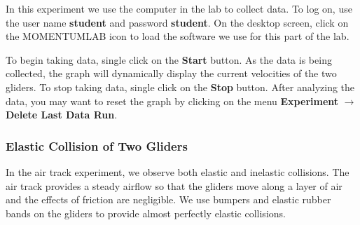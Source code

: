 In this experiment we use the computer in the lab to collect data. To log on, use the user name \textbf{student} and password \textbf{student}. On the desktop screen, click on the MOMENTUMLAB icon to load the software we use for this part of the lab.
\myskip

To begin taking data, single click on the \textbf{Start} button. As the data is being collected, the graph will dynamically display the current velocities of the two gliders. To stop taking data, single click on the \textbf{Stop} button. After analyzing the data, you may want to reset the graph by clicking on the menu \textbf{Experiment} $\rightarrow$ \textbf{Delete Last Data Run}.\myskip

\subsubsection{Elastic Collision of Two Gliders}\label{sec:elastic}

In the air track experiment, we observe both elastic and inelastic collisions. The air track provides a steady airflow so that the gliders move along a layer of air and the effects of friction are negligible. We use bumpers and elastic rubber bands on the gliders to provide almost perfectly elastic collisions.\myskip


